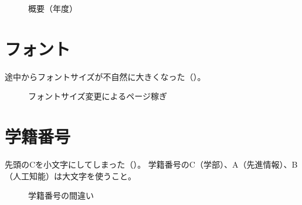 \begin{figure}
    \centering
    \caption{概要（年度）}
    \label{fig:fail-year03}
\end{figure}


\section{フォント}

途中からフォントサイズが不自然に大きくなった（）。

\begin{figure}[H]
    \centering
    \caption{フォントサイズ変更によるページ稼ぎ}
    \label{fig:fail-font}
\end{figure}


\section{学籍番号}

先頭のCを小文字にしてしまった（）。
学籍番号のC（学部）、A（先進情報）、B（人工知能）は大文字を使うこと。

\begin{figure}[H]
    \centering
    \caption{学籍番号の間違い}
    \label{fig:fail-id}
\end{figure}


